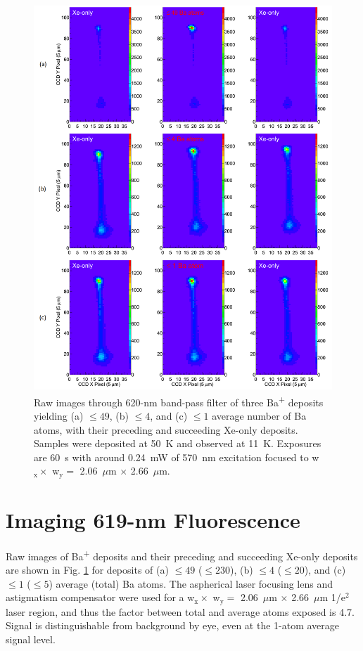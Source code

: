 \begin{figure} %
        \centering
                \includegraphics[width=.95\textwidth]{figures/xebaxe_average_scrunched.png}
                \caption{Raw images through 620-nm band-pass filter of three Ba\textsuperscript{+} deposits yielding (a) $\leq 49$, (b) $\leq 4$, and (c) $\leq 1$ average number of Ba atoms, with their preceding and succeeding Xe-only deposits.  Samples were deposited at 50~K and observed at 11~K.  Exposures are 60~s with around 0.24~mW of 570~nm excitation focused to w$_{\text{x}} \times$ w$_{\text{y}} =$ 2.06~$\mu$m $\times$ 2.66~$\mu$m.}
\label{fig:xebaxe}
\end{figure}

\section{Imaging 619-nm Fluorescence}
\label{sec:imaging619}

Raw images of Ba\textsuperscript{+} deposits and their preceding and succeeding Xe-only deposits are shown in Fig. \ref{fig:xebaxe} for deposits of (a) $\leq 49$ ($\leq 230$), (b) $\leq 4$ ($\leq 20$), and (c) $\leq 1$ ($\leq 5$) average (total) Ba atoms.  The aspherical laser focusing lens and astigmatism compensator were used for a w$_{\text{x}} \times$ w$_{\text{y}} =$ 2.06~$\mu$m $\times$ 2.66~$\mu$m 1/e$^{2}$ laser region, and thus the factor between total and average atoms exposed is 4.7.  Signal is distinguishable from background by eye, even at the 1-atom average signal level.

